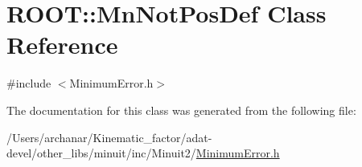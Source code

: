 \hypertarget{classROOT_1_1Minuit2_1_1MinimumError_1_1MnNotPosDef}{}\section{R\+O\+OT\+:\+:Mn\+Not\+Pos\+Def Class Reference}
\label{classROOT_1_1Minuit2_1_1MinimumError_1_1MnNotPosDef}


{\ttfamily \#include $<$Minimum\+Error.\+h$>$}



The documentation for this class was generated from the following file\+:\begin{DoxyCompactItemize}
\item 
/\+Users/archanar/\+Kinematic\+\_\+factor/adat-\/devel/other\+\_\+libs/minuit/inc/\+Minuit2/\mbox{\hyperlink{adat-devel_2other__libs_2minuit_2inc_2Minuit2_2MinimumError_8h}{Minimum\+Error.\+h}}\end{DoxyCompactItemize}

